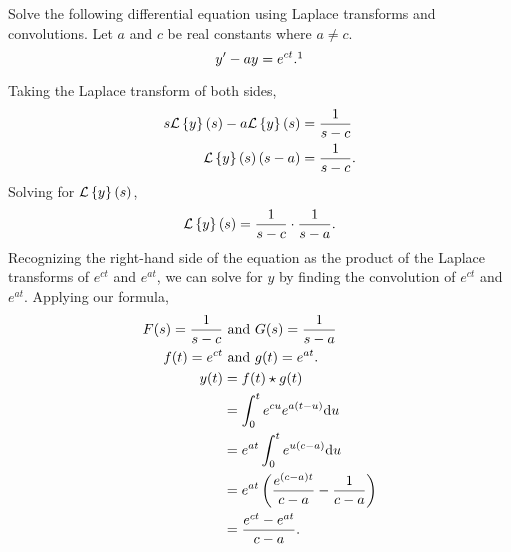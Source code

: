\begin{example}
	Solve the following differential equation using Laplace transforms and convolutions.
	Let $a$ and $c$ be real constants where $a \neq c$.
	\begin{equation*}
		y' - ay = e^{ct}.\footnotemark
	\end{equation*}
\end{example}
\noindent
Taking the Laplace transform of both sides,
\begin{align*}
	s\mathcal{L}\left\{ y \right\}\left(s\right) - a\mathcal{L}\left\{ y \right\}\left(s\right) &= \frac{1}{s-c} \\
	\mathcal{L}\left\{ y \right\}\left(s\right)(s-a) &= \frac{1}{s-c}.
\end{align*}
Solving for $\mathcal{L}\left\{ y \right\}\left(s\right)$,
\begin{equation*}
	\mathcal{L}\left\{ y \right\}\left(s\right) = \frac{1}{s-c} \cdot \frac{1}{s-a}.
\end{equation*}
Recognizing the right-hand side of the equation as the product of the Laplace transforms of $e^{ct}$ and $e^{at}$, we can solve for $y$ by finding the convolution of $e^{ct}$ and $e^{at}$.
Applying our formula,
\begin{align*}
	F(s) = \frac{1}{s-c} &\text{ and } G(s) = \frac{1}{s-a} \\
	f(t) = e^{ct} &\text{ and } g(t) = e^{at}. \\
	y(t) &= f(t) \star g(t) \\
	&= \int_{0}^{t}{e^{cu}e^{a(t-u)}\mathrm{d} u} \\
	&= e^{at}\int_{0}^{t}{e^{u(c-a)}\mathrm{d} u} \\
	&= e^{at}\left(\frac{e^{(c-a)t}}{c-a} - \frac{1}{c-a}\right) \\
	&= \frac{e^{ct} - e^{at}}{c-a}.
\end{align*}